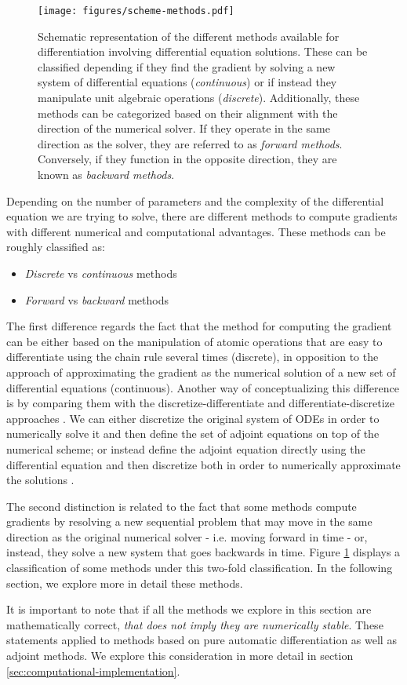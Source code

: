 \begin{figure}[t]
    \centering
    \texttt{[image: figures/scheme-methods.pdf]}
    \caption{Schematic representation of the different methods available for differentiation involving differential equation solutions. These can be classified depending if they find the gradient by solving a new system of differential equations (\textit{continuous}) or if instead they manipulate unit algebraic operations (\textit{discrete}). Additionally, these methods can be categorized based on their alignment with the direction of the numerical solver. If they operate in the same direction as the solver, they are referred to as \textit{forward methods}. Conversely, if they function in the opposite direction, they are known as \textit{backward methods}.}
    \label{fig:diff}
\end{figure}
Depending on the number of parameters and the complexity of the differential equation we are trying to solve, there are different methods to compute gradients with different numerical and computational advantages.
These methods can be roughly classified as:
\begin{itemize}
    \item \textit{Discrete} vs \textit{continuous} methods
    \item \textit{Forward} vs \textit{backward} methods
\end{itemize}
The first difference regards the fact that the method for computing the gradient can be either based on the manipulation of atomic operations that are easy to differentiate using the chain rule several times (discrete), in opposition to the approach of approximating the gradient as the numerical solution of a new set of differential equations (continuous).
Another way of conceptualizing this difference is by comparing them with the discretize-differentiate and differentiate-discretize approaches \cite{bradley2013pde, Onken_Ruthotto_2020, FATODE2014, Sirkes_Tziperman_1997}.   
We can either discretize the original system of ODEs in order to numerically solve it and then define the set of adjoint equations on top of the numerical scheme; or instead define the adjoint equation directly using the differential equation and then discretize both in order to numerically approximate the solutions \cite{Giles_Pierce_2000}.

The second distinction is related to the fact that some methods compute gradients by resolving a new sequential problem that may move in the same direction as the original numerical solver - i.e. moving forward in time - or, instead, they solve a new system that goes backwards in time. 
Figure \ref{fig:diff} displays a classification of some methods under this two-fold classification. In the following section, we explore more in detail these methods.

It is important to note that if all the methods we explore in this section are mathematically correct, \textit{that does not imply they are numerically stable}.
These statements applied to methods based on pure automatic differentiation as well as adjoint methods. 
We explore this consideration in more detail in section \ref{sec:computational-implementation}.
